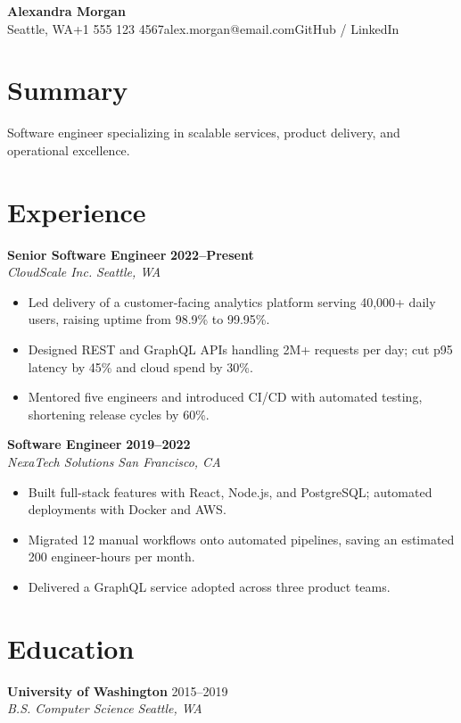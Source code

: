 \documentclass[10pt,letterpaper]{article}
\begin{document}
\begin{center}\textbf{\LARGE Alexandra Morgan}\\[2pt]
\small Seattle, WA\textbar{}+1 555 123 4567\textbar{}alex.morgan@email.com\textbar{}GitHub / LinkedIn\end{center}

\section{Summary}
\noindent Software engineer specializing in scalable services, product delivery, and operational excellence.

\section{Experience}
\noindent\textbf{Senior Software Engineer} \hfill \textbf{2022--Present}\\
\textit{CloudScale Inc.} \hfill \textit{Seattle, WA}\\[2pt]
\begin{itemize}
\item Led delivery of a customer-facing analytics platform serving 40,000+ daily users, raising uptime from 98.9\% to 99.95\%.
\item Designed REST and GraphQL APIs handling 2M+ requests per day; cut p95 latency by 45\% and cloud spend by 30\%.
\item Mentored five engineers and introduced CI/CD with automated testing, shortening release cycles by 60\%.
\end{itemize}
\vspace{5pt}
\noindent\textbf{Software Engineer} \hfill \textbf{2019--2022}\\
\textit{NexaTech Solutions} \hfill \textit{San Francisco, CA}\\[2pt]
\begin{itemize}
\item Built full-stack features with React, Node.js, and PostgreSQL; automated deployments with Docker and AWS.
\item Migrated 12 manual workflows onto automated pipelines, saving an estimated 200 engineer-hours per month.
\item Delivered a GraphQL service adopted across three product teams.
\end{itemize}
\vspace{5pt}
\section{Education}
\noindent\textbf{University of Washington} \hfill 2015--2019\\
\textit{B.S. Computer Science} \hfill \textit{Seattle, WA}
\end{document}
